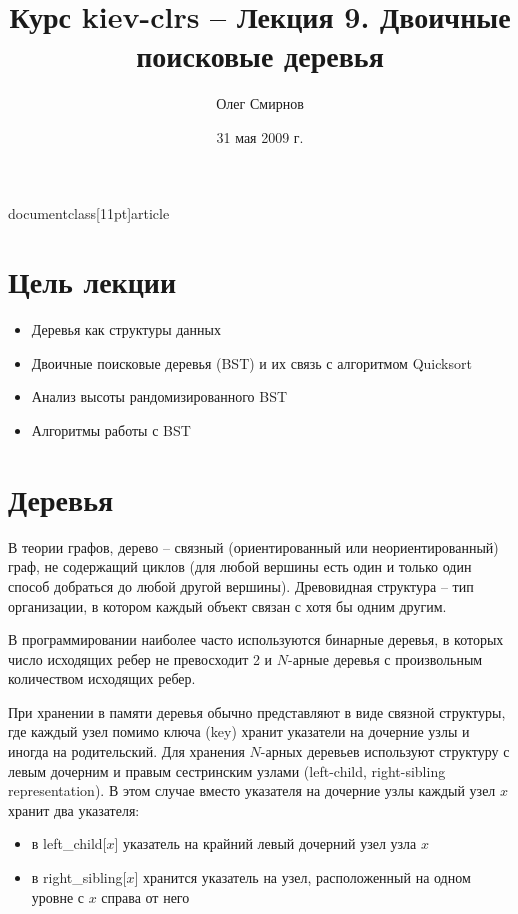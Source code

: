 documentclass[11pt]{article}
\usepackage[utf8]{inputenc}
\usepackage[russian]{babel}
\usepackage[T1]{fontenc}
\usepackage{amssymb,amsmath,clrscode,graphicx,indentfirst}

\author{Олег Смирнов}
\title{Курс kiev-clrs -- Лекция 9. Двоичные поисковые деревья}
\date{31 мая 2009 г.}


\maketitle
\tableofcontents

\newpage
\setlength{\parskip}{1ex plus 0.5ex minus 0.2ex}
\section{Цель лекции}
\begin{itemize}
\item Деревья как структуры данных
\item Двоичные поисковые деревья (BST) и их связь с алгоритмом Quicksort
\item Анализ высоты рандомизированного BST
\item Алгоритмы работы с BST
\end{itemize}

\section{Деревья}

В теории графов, дерево -- связный (ориентированный или неориентированный) граф, не содержащий циклов (для любой вершины есть один и только один способ добраться до любой другой вершины). Древовидная структура -- тип организации, в котором каждый объект связан с хотя бы одним другим.

В программировании наиболее часто используются бинарные деревья, в которых число исходящих ребер не превосходит 2 и $N$-арные деревья с произвольным количеством исходящих ребер.

При хранении в памяти деревья обычно представляют в виде связной структуры, где каждый узел помимо ключа (key) хранит указатели на дочерние узлы и иногда на родительский. Для хранения $N$-арных деревьев используют структуру с левым дочерним и правым сестринским узлами (left-child, right-sibling representation). В этом случае вместо указателя на дочерние узлы каждый узел $x$ хранит два указателя:
\begin{itemize}
\item в left\_child[$x$] указатель на крайний левый дочерний узел узла $x$
\item в right\_sibling[$x$] хранится указатель на узел, расположенный на одном уровне с $x$ справа от него
\end{itemize}

